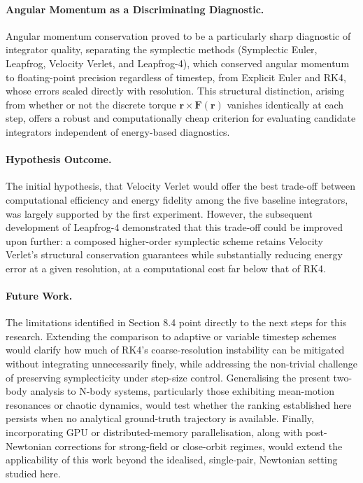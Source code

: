 \paragraph{Angular Momentum as a Discriminating Diagnostic.} Angular momentum conservation proved to be a
particularly sharp diagnostic of integrator quality, separating the symplectic methods (Symplectic Euler,
Leapfrog, Velocity Verlet, and Leapfrog-4), which conserved angular momentum to floating-point precision
regardless of timestep, from Explicit Euler and RK4, whose errors scaled directly with resolution. This
structural distinction, arising from whether or not the discrete torque $\mathbf{r} \times \mathbf{F}(\mathbf{r})$
vanishes identically at each step, offers a robust and computationally cheap criterion for evaluating candidate
integrators independent of energy-based diagnostics.

\paragraph{Hypothesis Outcome.} The initial hypothesis, that Velocity Verlet would offer the best trade-off
between computational efficiency and energy fidelity among the five baseline integrators, was largely supported
by the first experiment. However, the subsequent development of Leapfrog-4 demonstrated that this trade-off
could be improved upon further: a composed higher-order symplectic scheme retains Velocity Verlet's structural
conservation guarantees while substantially reducing energy error at a given resolution, at a computational
cost far below that of RK4.

\paragraph{Future Work.} The limitations identified in Section 8.4 point directly to the next steps for this
research. Extending the comparison to adaptive or variable timestep schemes would clarify how much of RK4's
coarse-resolution instability can be mitigated without integrating unnecessarily finely, while addressing the
non-trivial challenge of preserving symplecticity under step-size control. Generalising the present two-body
analysis to N-body systems, particularly those exhibiting mean-motion resonances or chaotic dynamics, would
test whether the ranking established here persists when no analytical ground-truth trajectory is available.
Finally, incorporating GPU or distributed-memory parallelisation, along with post-Newtonian corrections for
strong-field or close-orbit regimes, would extend the applicability of this work beyond the idealised,
single-pair, Newtonian setting studied here.

